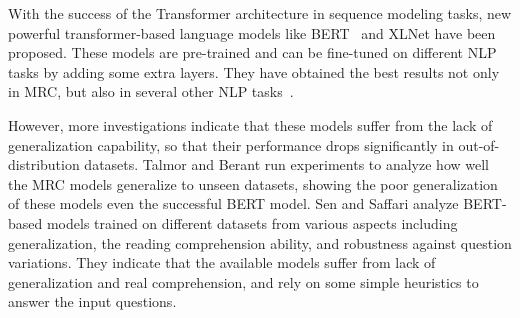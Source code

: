 \documentclass[review]{elsarticle}
\begin{document}
With the success of the Transformer architecture \citep{vaswani2017attention} in sequence modeling tasks, new powerful transformer-based language models like BERT~\cite{devlin2018bert} and XLNet \cite{yang2019xlnet} have  been proposed. These models are pre-trained and can be fine-tuned on different NLP tasks by adding some extra layers. They have obtained the best results not only in MRC, but also in several other NLP tasks~\cite{DCNplus-Zhang,su-etal-2019-generalizing, Alshahrani-2020, xiao-etal-2020-modeling, Gong-2019}.

However, more investigations indicate that these models suffer from the lack of generalization capability, so that their performance drops significantly in out-of-distribution datasets. Talmor and Berant \cite{talmor-berant-2019-multiqa} run experiments to analyze how well the MRC models generalize to unseen datasets, showing the poor generalization of these models even the successful BERT model. Sen and Saffari \cite{sen-saffari-2020} analyze BERT-based models trained on different datasets from various aspects including generalization, the reading comprehension ability, and robustness against question variations. They indicate that the available models suffer from lack of generalization and real comprehension, and rely on some simple heuristics to answer the input questions.
\end{document}
